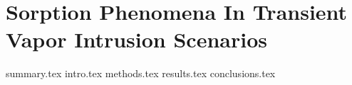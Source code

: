 \documentclass[../thesis.tex]{subfiles}
\begin{document}
\chapter{Sorption Phenomena In Transient Vapor Intrusion Scenarios}\label{chp:sorption}

{summary.tex}
{intro.tex}
{methods.tex}
{results.tex}
{conclusions.tex}
\end{document}
